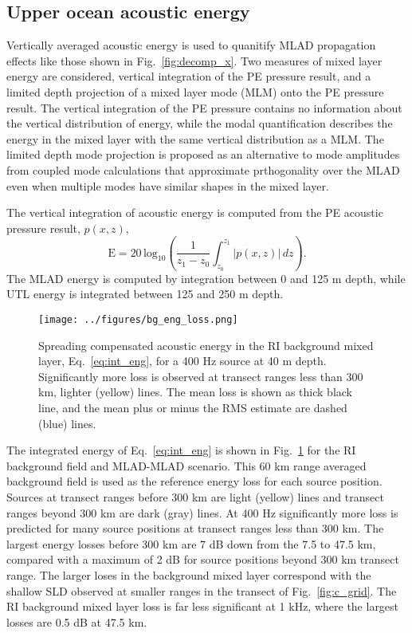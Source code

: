 \documentclass[preprint,NumberedRefs]{JASA}
\begin{document}
\subsection{Upper ocean acoustic energy}\label{ssec:bg}
Vertically averaged acoustic energy is used to quanitify MLAD propagation effects like those shown in Fig.~\ref{fig:decomp_x}. Two measures of mixed layer energy are considered, vertical integration of the PE pressure result, and a limited depth projection of a mixed layer mode (MLM) onto the PE pressure result. The vertical integration of the PE pressure contains no information about the vertical distribution of energy, while the modal quantification describes the energy in the mixed layer with the same vertical distribution as a MLM. The limited depth mode projection is proposed as an alternative to mode amplitudes from coupled mode calculations that approximate prthogonality over the MLAD even when multiple modes have similar shapes in the mixed layer.

The vertical integration of acoustic energy is computed from the PE acoustic pressure result, $p(x, z)$,
\begin{equation}
        \textrm{E} = 20 \, \textrm{log}_{10} \left( \frac{1}{z_1 - z_0} \int^{z_1}_{z_0} \left| p(x, z) \right| \,  dz \right).
    \label{eq:int_eng}
\end{equation}
The MLAD energy is computed by integration between 0 and 125 m depth, while UTL energy is integrated between 125 and 250 m depth.

\begin{figure}
\texttt{[image: ../figures/bg\_eng\_loss.png]}
    \caption{Spreading compensated acoustic energy in the RI background mixed layer, Eq.~\eqref{eq:int_eng}, for a 400 Hz source at 40 m depth. Significantly more loss is observed at transect ranges less than 300 km, lighter (yellow) lines. The mean loss is shown as thick black line, and the mean plus or minus the RMS estimate are dashed (blue) lines.}
    \label{fig:bg_eng}
\end{figure}
The integrated energy of Eq.~\eqref{eq:int_eng} is shown in Fig.~\ref{fig:bg_eng} for the RI background field and MLAD-MLAD scenario. This 60 km range averaged background field is used as the reference energy loss for each source position. Sources at transect ranges before 300 km are light (yellow) lines and transect ranges beyond 300 km are dark (gray) lines. At 400 Hz significantly more loss is predicted for many source positions at transect ranges less than 300 km. The largest energy losses before 300 km are 7 dB down from the 7.5 to 47.5 km, compared with a maximum of 2 dB for source positions beyond 300 km transect range. The larger loses in the background mixed layer correspond with the shallow SLD observed at smaller ranges in the transect of Fig.~\ref{fig:c_grid}. The RI background mixed layer loss is far less significant at 1 kHz, where the largest losses are 0.5 dB at 47.5 km.
\end{document}
